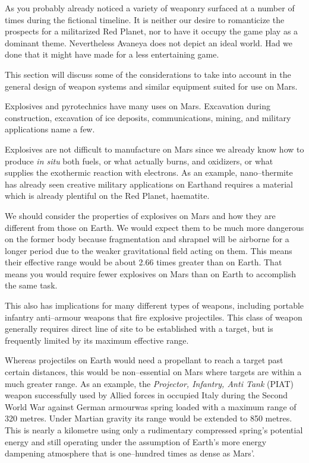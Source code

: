 

As you probably already noticed a variety of weaponry surfaced at a number of times during the fictional timeline. It is neither our desire to romanticize the prospects for a militarized Red Planet, nor to have it occupy the game play as a dominant theme. Nevertheless Avaneya does not depict an ideal world. Had we done that it might have made for a less entertaining game.

This section will discuss some of the considerations to take into account in the general design of weapon systems and similar equipment suited for use on Mars.


Explosives and pyrotechnics have many uses on Mars. Excavation during construction, excavation of ice deposits, communications, mining, and military applications name a few.

Explosives are not difficult to manufacture on Mars since we already know how to produce {\it in situ} both fuels, or what actually burns, and oxidizers, or what supplies the exothermic reaction with electrons. As an example, nano--thermite has already seen creative military applications on Earth\footnotecite[harrit2009] and requires a material which is already plentiful on the Red Planet, haematite.

We should consider the properties of explosives on Mars and how they are different from those on Earth. We would expect them to be much more dangerous on the former body because fragmentation and shrapnel will be airborne for a longer period due to the weaker gravitational field acting on them. This means their effective range would be about 2.66 times greater than on Earth. That means you would require fewer explosives on Mars than on Earth to accomplish the same task.

This also has implications for many different types of weapons, including portable infantry anti--armour weapons that fire explosive projectiles. This class of weapon generally requires direct line of site to be established with a target, but is frequently limited by its maximum effective range. 

Whereas projectiles on Earth would need a propellant to reach a target past certain distances, this would be non--essential on Mars where targets are within a much greater range. As an example, the {\it Projector, Infantry, Anti Tank} (PIAT) weapon successfully used by Allied forces in occupied Italy during the Second World War against German armour\footnotecite[extras={ p.~351.}][roy1965] was spring loaded with a maximum range of 320 metres. Under Martian gravity its range would be extended to 850 metres. This is nearly a kilometre using only a rudimentary compressed spring's potential energy and still operating under the assumption of Earth's more energy dampening atmosphere that is one--hundred times as dense as Mars'.

